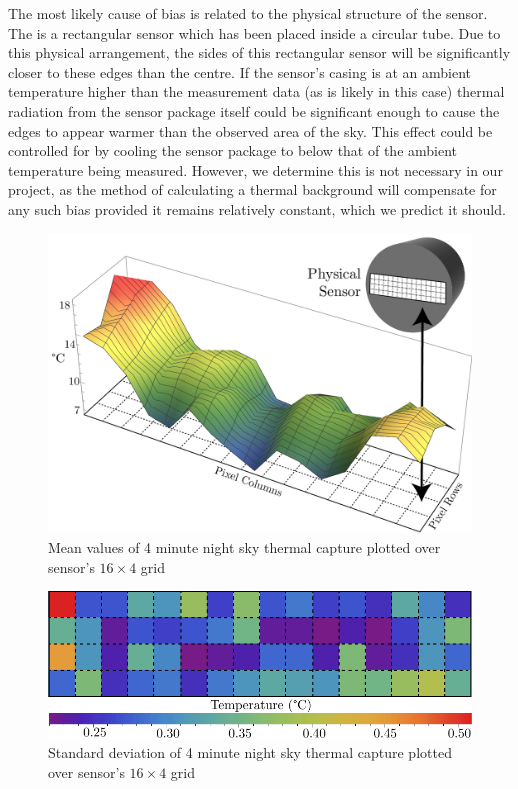 \documentclass[../thesis/thesis.tex]{subfiles}
\begin{document}
The most likely cause of bias is related to the physical structure of the sensor. The \mlx is a rectangular sensor which has been placed inside a circular tube. Due to this physical arrangement, the sides of this rectangular sensor will be significantly closer to these edges than the centre. If the sensor's casing is at an ambient temperature higher than the measurement data (as is likely in this case) thermal radiation from the sensor package itself could be significant enough to cause the edges to appear warmer than the observed area of the sky. This effect could be controlled for by cooling the sensor package to below that of the ambient temperature being measured. However, we determine this is not necessary in our project, as the method of calculating a thermal background will compensate for any such bias provided it remains relatively constant, which we predict it should.

\begin{figure}
\centering
\includegraphics[width=\textwidth]{../diagrams/rest-avg-embed.pdf}
\caption{Mean values of 4 minute night sky thermal capture plotted over sensor's $16\times4$ grid}
\label{fig:meanplot}
\end{figure}

\begin{figure}
\centering
\includegraphics[width=\textwidth]{../diagrams/stddev-contour2.pdf}
\caption{Standard deviation of 4 minute night sky thermal capture plotted over sensor's $16\times4$ grid}
\label{fig:stdplot}
\end{figure}
\end{document}
